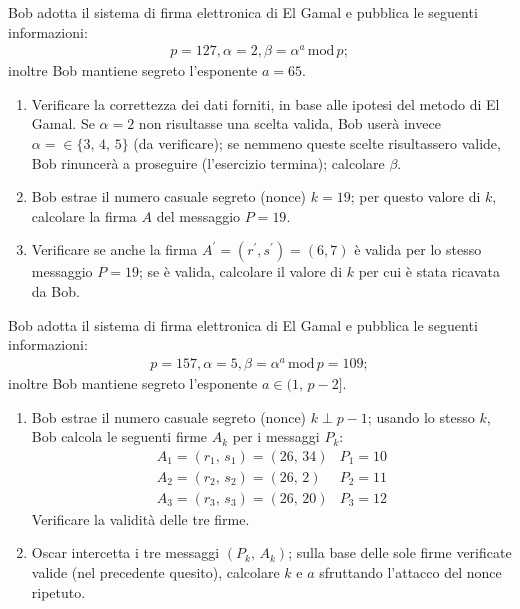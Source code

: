         Bob adotta il sistema di firma elettronica di El Gamal e pubblica le seguenti informazioni:
        \begin{gather*}
            p=127, \alpha = 2, \beta = \alpha^a\,\mathrm{mod}\,p
        ;\end{gather*}
        inoltre Bob mantiene segreto l'esponente $a=65$.
        \begin{enumerate}
            \item Verificare la correttezza dei dati forniti, in base alle ipotesi del metodo di El Gamal. 
                Se $\alpha=2$ non risultasse una scelta valida, Bob userà invece $\alpha=\in\{3,\,4,\,5\}$ 
                (da verificare); se nemmeno queste scelte risultassero valide, Bob rinuncerà a proseguire 
                (l'esercizio termina); calcolare $\beta$.
            \item Bob estrae il numero casuale segreto (nonce) $k=19$; per questo valore di $k$, calcolare 
                la firma $A$ del messaggio $P=19$.
            \item Verificare se anche la firma $A^{\prime}=(r^{\prime}, s^{\prime})=(6,7)$ è valida per 
                lo stesso messaggio $P=19$; se è valida, calcolare il valore di $k$ per cui è stata ricavata da Bob.
        \end{enumerate}

        Bob adotta il sistema di firma elettronica di El Gamal e pubblica le seguenti informazioni:
        \begin{gather*}
            p=157, \alpha = 5, \beta = \alpha^a\,\mathrm{mod}\,p=109
        ;\end{gather*}
        inoltre Bob mantiene segreto l'esponente $a\in (1,\,p-2]$.
        \begin{enumerate}
            \item Bob estrae il numero casuale segreto (nonce) $k\perp p-1$; usando lo stesso $k$, 
                Bob calcola le seguenti firme $A_k$ per i messaggi $P_k$:
                \[\begin{array}{ll}
                    A_1=(r_1,\,s_1)=(26,\,34) & P_1=10\\
                    A_2=(r_2,\,s_2)=(26,\,2) & P_2=11\\
                    A_3=(r_3,\,s_3)=(26,\,20) & P_3=12
                \end{array}\]
                Verificare la validità delle tre firme.
            \item Oscar intercetta i tre messaggi $(P_k,\,A_k)$; sulla base delle sole firme verificate valide 
                (nel precedente quesito), calcolare $k$ e $a$ sfruttando l'attacco del nonce ripetuto.
        \end{enumerate}

